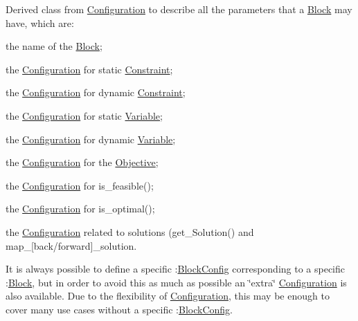 Derived class from \mbox{\hyperlink{class_s_m_spp__di__unipi__it_1_1_configuration}{Configuration}} to describe all the parameters that a \mbox{\hyperlink{class_s_m_spp__di__unipi__it_1_1_block}{Block}} may have, which are\+:


\begin{DoxyItemize}
\item the name of the \mbox{\hyperlink{class_s_m_spp__di__unipi__it_1_1_block}{Block}};
\item the \mbox{\hyperlink{class_s_m_spp__di__unipi__it_1_1_configuration}{Configuration}} for static \mbox{\hyperlink{class_s_m_spp__di__unipi__it_1_1_constraint}{Constraint}};
\item the \mbox{\hyperlink{class_s_m_spp__di__unipi__it_1_1_configuration}{Configuration}} for dynamic \mbox{\hyperlink{class_s_m_spp__di__unipi__it_1_1_constraint}{Constraint}};
\item the \mbox{\hyperlink{class_s_m_spp__di__unipi__it_1_1_configuration}{Configuration}} for static \mbox{\hyperlink{class_s_m_spp__di__unipi__it_1_1_variable}{Variable}};
\item the \mbox{\hyperlink{class_s_m_spp__di__unipi__it_1_1_configuration}{Configuration}} for dynamic \mbox{\hyperlink{class_s_m_spp__di__unipi__it_1_1_variable}{Variable}};
\item the \mbox{\hyperlink{class_s_m_spp__di__unipi__it_1_1_configuration}{Configuration}} for the \mbox{\hyperlink{class_s_m_spp__di__unipi__it_1_1_objective}{Objective}};
\item the \mbox{\hyperlink{class_s_m_spp__di__unipi__it_1_1_configuration}{Configuration}} for is\+\_\+feasible();
\item the \mbox{\hyperlink{class_s_m_spp__di__unipi__it_1_1_configuration}{Configuration}} for is\+\_\+optimal();
\item the \mbox{\hyperlink{class_s_m_spp__di__unipi__it_1_1_configuration}{Configuration}} related to solutions (get\+\_\+\+Solution() and map\+\_\+\mbox{[}back/forward\mbox{]}\+\_\+solution.
\end{DoxyItemize}

It is always possible to define a specific \+:\mbox{\hyperlink{class_s_m_spp__di__unipi__it_1_1_block_config}{Block\+Config}} corresponding to a specific \+:\mbox{\hyperlink{class_s_m_spp__di__unipi__it_1_1_block}{Block}}, but in order to avoid this as much as possible an \char`\"{}extra\char`\"{} \mbox{\hyperlink{class_s_m_spp__di__unipi__it_1_1_configuration}{Configuration}} is also available. Due to the flexibility of \mbox{\hyperlink{class_s_m_spp__di__unipi__it_1_1_configuration}{Configuration}}, this may be enough to cover many use cases without a specific \+:\mbox{\hyperlink{class_s_m_spp__di__unipi__it_1_1_block_config}{Block\+Config}}. 

